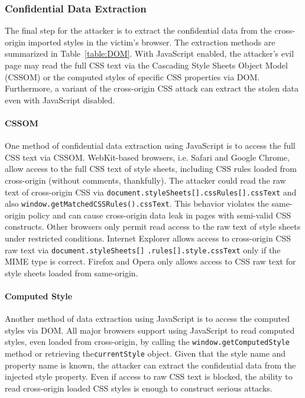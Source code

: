\documentclass{acm_proc_article-sp}
\begin{document}
\subsubsection{Confidential Data Extraction}\label{sec:extraction}
The final step for the attacker is to extract the confidential data from the cross-origin imported styles in the victim's browser. The extraction methods are summarized in Table~\ref{table:DOM}. With JavaScript enabled, the attacker's evil page may read the full CSS text via the Cascading Style Sheets Object Model (CSSOM) or the computed styles of specific CSS properties via DOM. Furthermore, a variant of the cross-origin CSS attack can extract the stolen data even with JavaScript disabled.

\paragraph{CSSOM}
One method of confidential data extraction using JavaScript is to access the full CSS text via CSSOM. WebKit-based browsers, i.e. Safari and Google Chrome, allow access to the full CSS text of style sheets, including CSS rules loaded from cross-origin (without comments, thankfully). The attacker could read the raw text of cross-origin CSS via \texttt{document.styleSheets[]}\texttt{.cssRules[]}\texttt{.cssText} and also \texttt{window.getMatchedCSSRules().cssText}. This behavior violates the same-origin policy and can cause cross-origin data leak in pages with semi-valid CSS constructs. Other browsers only permit read access to the raw text of style sheets under restricted conditions. Internet Explorer allows access to cross-origin CSS raw text via \texttt{document.styleSheets[]} \texttt{.rules[]}\texttt{.style}\texttt{.cssText} only if the MIME type is correct. Firefox and Opera only allows access to CSS raw text for style sheets loaded from same-origin.

\paragraph{Computed Style}
Another method of data extraction using JavaScript is to access the computed styles via DOM. All major browsers support using JavaScript to read computed styles, even loaded from cross-origin, by calling the \texttt{window.getComputedStyle} method or retrieving the\linebreak \texttt{currentStyle} object. Given that the style name and property name is known, the attacker can extract the confidential data from the injected style property. Even if access to raw CSS text is blocked, the ability to read cross-origin loaded CSS styles is enough to construct serious attacks.
\end{document}
